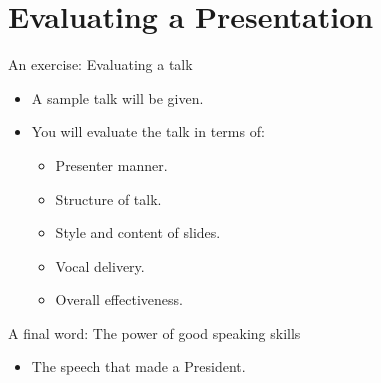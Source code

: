 \documentclass{beamer}
\newcommand{\bi}{\begin{itemize}}
\newcommand{\ei}{\end{itemize}}
\begin{document}
\section{Evaluating a Presentation}
\begin{frame}{An exercise: Evaluating a talk}
\bi
\item A sample talk will be given.
\item You will evaluate the talk in terms of:
  \bi
  \item Presenter manner.
  \item Structure of talk.
  \item Style and content of slides.
  \item Vocal delivery.
  \item Overall effectiveness.
  \ei
\ei
\end{frame}

\begin{frame}{A final word: The power of good speaking skills}
\bi
\item
The speech that made a President.
\ei
\end{frame}
\end{document}
